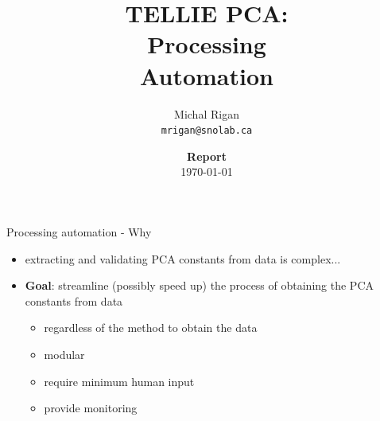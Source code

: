 \documentclass[xcolor=table]{beamer}
\title{TELLIE PCA:\\ Processing \\ Automation}
\author{Michal Rigan\\ %
          \texttt{mrigan@snolab.ca}} %
\date{\textbf{Report}\\
\today} %
\institute{University of Sussex} %
\begin{document}
{
\begin{frame}
  \titlepage %
\end{frame}
}

\begin{frame}{Processing automation - Why}
\begin{itemize}
	\item extracting and validating PCA constants from data is complex...
	\item \textbf{Goal}: streamline (possibly speed up) the process of obtaining the PCA constants from data
	\begin{itemize}
		\item regardless of the method to obtain the data
		\item modular
		\item require minimum human input
		\item provide monitoring
	\end{itemize}
\end{itemize}
\end{frame}

\begin{frame}
\noindent{}
\end{frame}
\end{document}
